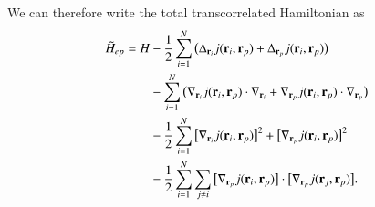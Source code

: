 \documentclass[aip,jcp,reprint,noshowkeys,superscriptaddress]{revtex4-1}
\newcommand{\bri}[1]{{\bf r}_{#1}}
\newcommand{\Hept}[0]{\tilde{H}_{ep}}
\begin{document}
We can therefore write the total transcorrelated Hamiltonian as 
\begin{equation}
 \begin{aligned}
 \Hept  = H& -\frac{1}{2} \sum_{i=1}^N \big(\Delta_{\bri{i}} j(\bri{i},\bri{p}) + \Delta_{\bri{p}} j(\bri{i},\bri{p}) \big) \\
           & -\sum_{i=1}^N \big(\nabla_{\bri{i}} j(\bri{i},\bri{p}) \cdot\nabla_{\bri{i}} + \nabla_{\bri{p}} j(\bri{i},\bri{p}) \cdot \nabla_{\bri{p}} \big) \\
           & -\frac{1}{2} \sum_{i=1}^N \big[ \nabla_{\bri{i}} j(\bri{i},\bri{p})\big]^2 + \big[ \nabla_{\bri{p}} j(\bri{i},\bri{p})\big]^2 \\
           & -\frac{1}{2} \sum_{i=1}^N \sum_{j\ne i} \big[ \nabla_{\bri{p}} j(\bri{i},\bri{p})\big] \cdot \big[ \nabla_{\bri{p}} j(\bri{j},\bri{p})\big].
 \end{aligned}
\end{equation}
\end{document}
